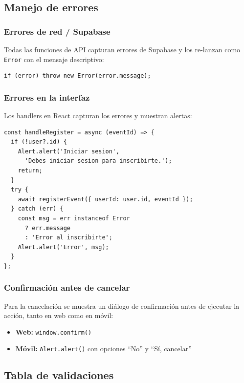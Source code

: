 \documentclass[12pt,letterpaper]{article}
\begin{document}
\subsection{Manejo de errores}

\subsubsection*{Errores de red / Supabase}

Todas las funciones de API capturan errores de Supabase y los
re-lanzan como \texttt{Error} con el mensaje descriptivo:

\begin{verbatim}
if (error) throw new Error(error.message);
\end{verbatim}

\subsubsection*{Errores en la interfaz}

Los handlers en React capturan los errores y muestran alertas:

\begin{verbatim}
const handleRegister = async (eventId) => {
  if (!user?.id) {
    Alert.alert('Iniciar sesion',
      'Debes iniciar sesion para inscribirte.');
    return;
  }
  try {
    await registerEvent({ userId: user.id, eventId });
  } catch (err) {
    const msg = err instanceof Error
      ? err.message
      : 'Error al inscribirte';
    Alert.alert('Error', msg);
  }
};
\end{verbatim}

\subsubsection*{Confirmaci\'on antes de cancelar}

Para la cancelaci\'on se muestra un di\'alogo de confirmaci\'on
antes de ejecutar la acci\'on, tanto en web como en m\'ovil:

\begin{itemize}
  \item \textbf{Web:} \texttt{window.confirm()}
  \item \textbf{M\'ovil:} \texttt{Alert.alert()} con opciones
    ``No'' y ``S\'i, cancelar''
\end{itemize}

\subsection{Tabla de validaciones}
\end{document}
